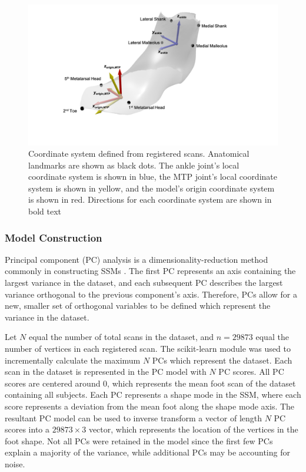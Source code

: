 \documentclass[defaultstyle,11pt]{comps}
\begin{document}
\begin{figure}
\hypertarget{fig:angles}{%
\centering
\includegraphics{../fig/SA2/coordsystem.png}
\caption{Coordinate system defined from registered scans. Anatomical landmarks are shown as black dots. The ankle joint's local coordinate system is shown in blue, the MTP joint's local coordinate system is shown in yellow, and the model's origin coordinate system is shown in red. Directions for each coordinate system are shown in bold text}\label{fig:angles}
}
\end{figure}

\hypertarget{model-construction}{%
\subsubsection{Model Construction}\label{model-construction}}

Principal component (PC) analysis is a dimensionality-reduction method commonly in constructing SSMs \citep{Reed2008, Park2015a, Conrad2019, Stankovic2020}.
The first PC represents an axis containing the largest variance in the dataset, and each subsequent PC describes the largest variance orthogonal to the previous component's axis.
Therefore, PCs allow for a new, smaller set of orthogonal variables to be defined which represent the variance in the dataset.

Let \(N\) equal the number of total scans in the dataset, and \(n=29873\) equal the number of vertices in each registered scan. The scikit-learn module \citep{JMLR:v12:pedregosa11a} was used to incrementally calculate the maximum \(N\) PCs which represent the dataset.
Each scan in the dataset is represented in the PC model with \(N\) PC scores.
All PC scores are centered around 0, which represents the mean foot scan of the dataset containing all subjects.
Each PC represents a shape mode in the SSM, where each score represents a deviation from the mean foot along the shape mode axis. The resultant PC model can be used to inverse transform a vector of length \(N\) PC scores into a \(29873\times 3\) vector, which represents the location of the vertices in the foot shape. Not all PCs were retained in the model since the first few PCs explain a majority of the variance, while additional PCs may be accounting for noise.
\end{document}
